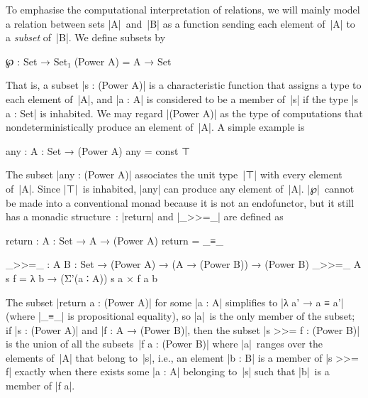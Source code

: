 To emphasise the computational interpretation of relations, we will mainly model a relation between sets |A|~and~|B| as a function sending each element of~|A| to a \emph{subset} of~|B|.
We define subsets by
\begin{code}
℘ : Set → Set₁
(Power A) = A → Set
\end{code}
That is, a subset |s : (Power A)| is a characteristic function that assigns a type to each element of~|A|, and |a : A| is considered to be a member of~|s| if the type |s a : Set| is inhabited.
We may regard |(Power A)| as the type of computations that nondeterministically produce an element of~|A|.
A simple example is
\begin{code}
any : {A : Set} → (Power A)
any = const ⊤
\end{code}
The subset |any : (Power A)| associates the unit type~|⊤| with every element of~|A|.
Since |⊤|~is inhabited, |any| can produce any element of~|A|.
|℘|~cannot be made into a conventional monad because it is not an endofunctor, but it still has a monadic structure~\cite{Altenkirch-relative-monads}:
|return| and |_>>=_| are defined as
\begin{code}
return : {A : Set} → A → (Power A)
return = _≡_

_>>=_ : {A B : Set} → (Power A) → (A → (Power B)) → (Power B)
_>>=_ {A} s f = λ b → (Σ'(a ∶ A)) s a × f a b
\end{code}
The subset |return a : (Power A)| for some |a : A| simplifies to |λ a' → a ≡ a'| (where |_≡_| is propositional equality), so |a|~is the only member of the subset; if |s : (Power A)| and |f : A → (Power B)|, then the subset |s >>= f : (Power B)| is the union of all the subsets~|f a : (Power B)| where |a|~ranges over the elements of~|A| that belong to~|s|, i.e., an element |b : B| is a member of |s >>= f| exactly when there exists some |a : A| belonging to~|s| such that |b|~is a member of |f a|.

